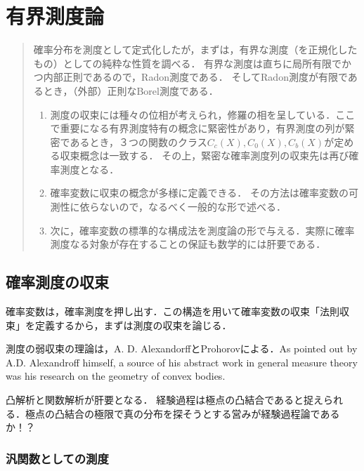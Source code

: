 \documentclass[uplatex,dvipdfmx]{jsreport}
\begin{document}
\chapter{有界測度論}

\begin{quotation}
    確率分布を測度として定式化したが，まずは，有界な測度（を正規化したもの）としての純粋な性質を調べる．
    有界な測度は直ちに局所有限でかつ内部正則であるので，Radon測度である．
    そしてRadon測度が有限であるとき，（外部）正則なBorel測度である．
    \begin{enumerate}
        \item 測度の収束には種々の位相が考えられ，修羅の相を呈している．ここで重要になる有界測度特有の概念に緊密性があり，有界測度の列が緊密であるとき，３つの関数のクラス$C_c(X),C_0(X),C_b(X)$が定める収束概念は一致する．
        その上，緊密な確率測度列の収束先は再び確率測度となる．
        \item 確率変数に収束の概念が多様に定義できる．
        その方法は確率変数の可測性に依らないので，なるべく一般的な形で述べる．
        \item 次に，確率変数の標準的な構成法を測度論の形で与える．実際に確率測度なる対象が存在することの保証も数学的には肝要である．
    \end{enumerate}
\end{quotation}

\section{確率測度の収束}

\begin{tcolorbox}[colframe=ForestGreen, colback=ForestGreen!10!white,breakable,colbacktitle=ForestGreen!40!white,coltitle=black,fonttitle=\bfseries\sffamily,
    title=Banach空間論の発展を後押しした消息]
    確率変数は，確率測度を押し出す．この構造を用いて確率変数の収束「法則収束」を定義するから，まずは測度の収束を論じる．

    測度の弱収束の理論は，A. D. AlexandorffとProhorovによる．As pointed out by A.D. Alexandroﬀ himself, a source of his abstract work
    in general measure theory was his research on the geometry of convex bodies.

    凸解析と関数解析が肝要となる．
    経験過程は極点の凸結合であると捉えられる．極点の凸結合の極限で真の分布を探そうとする営みが経験過程論であるか！？
\end{tcolorbox}

\subsection{汎関数としての測度}
\end{document}
